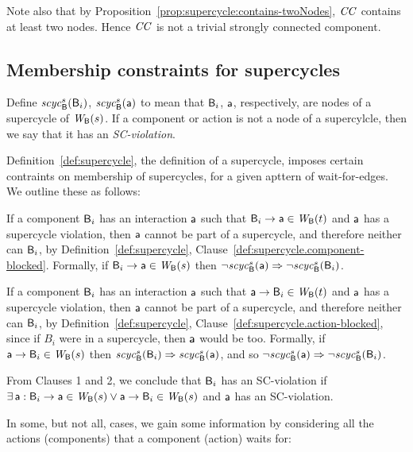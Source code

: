 Note also that by Proposition~\ref{prop:supercycle:contains-twoNodes}, $\mathit{CC}$ contains at least two nodes. Hence $\mathit{CC}$ is
not a trivial strongly connected component.





\subsection{Membership constraints for supercycles}

Define $\mathit{scyc}_{\mathsf{B}}^{s}({\mathsf{B}_i})$, $\mathit{scyc}_{\mathsf{B}}^{s}({\mathsf{a}})$ to mean that $\mathsf{B}_i$,
$\mathsf{a}$, respectively, are nodes of a supercycle of $\mathit{W}_{\mathsf{B}}({s})$.
If a component or action is not a node of a supercylcle, then we say that it has an 
\emph{SC-violation}.

Definition~\ref{def:supercycle}, the definition of a supercycle, imposes certain contraints on membership of
supercycles, for a given apttern of wait-for-edges. We outline these as follows:
\bn

\item If a component $\mathsf{B}_i$ has an interaction $\mathsf{a}$ such that $\mathsf{B}_i \rightarrow \mathsf{a} \in \mathit{W}_{\mathsf{B}}({t})$ and
  $\mathsf{a}$ has a supercycle violation, then $\mathsf{a}$ cannot be part of a supercycle, and therefore
  neither can $\mathsf{B}_i$, by Definition~\ref{def:supercycle},
  Clause~\ref{def:supercycle.component-blocked}.  Formally, if $\mathsf{B}_i \rightarrow \mathsf{a} \in \mathit{W}_{\mathsf{B}}({s})$ then
  $\neg \mathit{scyc}_{\mathsf{B}}^{s}({\mathsf{a}}) \Rightarrow \neg \mathit{scyc}_{\mathsf{B}}^{s}({\mathsf{B}_i})$.

\item If a component $\mathsf{B}_i$ has an interaction $\mathsf{a}$ such that $\mathsf{a} \rightarrow \mathsf{B}_i \in \mathit{W}_{\mathsf{B}}({t})$ and
  $\mathsf{a}$ has a supercycle violation, then $\mathsf{a}$ cannot be part of a supercycle, and therefore
  neither can $\mathsf{B}_i$, by Definition~\ref{def:supercycle},
  Clause~\ref{def:supercycle.action-blocked}, since if $B_i$ were in a supercycle, then $\mathsf{a}$ would
  be too.
Formally, if $\mathsf{a} \rightarrow \mathsf{B}_i \in \mathit{W}_{\mathsf{B}}({s})$ then $\mathit{scyc}_{\mathsf{B}}^{s}({\mathsf{B}_i}) \Rightarrow \mathit{scyc}_{\mathsf{B}}^{s}({\mathsf{a}})$, and so $\neg \mathit{scyc}_{\mathsf{B}}^{s}({\mathsf{a}}) \Rightarrow \neg \mathit{scyc}_{\mathsf{B}}^{s}({\mathsf{B}_i})$.

\en

From Clauses 1 and 2, we conclude that $\mathsf{B}_i$ has an SC-violation if 
$\exists\, \mathsf{a}: \mathsf{B}_i \rightarrow \mathsf{a} \in \mathit{W}_{\mathsf{B}}({s}) \lor \mathsf{a} \rightarrow \mathsf{B}_i \in \mathit{W}_{\mathsf{B}}({s})$ and $\mathsf{a}$ has an SC-violation.

In some, but not all, cases, we gain some information by considering all the actions (components) that a component
(action) waits for:

\bn

